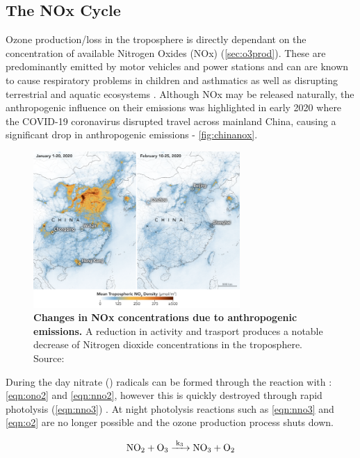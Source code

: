 \subsection{The NOx Cycle}\label{sec:noxcycle}
Ozone production/loss in the troposphere is directly dependant on the concentration of available Nitrogen Oxides (NOx) (\autoref{sec:o3prod}). These are predominantly emitted by motor vehicles and power stations and can are known to cause respiratory problems in children and asthmatics as well as disrupting terrestrial and aquatic ecosystems \citep{eea}. Although NOx may be released naturally, the anthropogenic influence on their emissions was highlighted in early 2020 where the COVID-19 coronavirus disrupted travel across mainland China, causing a significant drop in anthropogenic emissions - \autoref{fig:chinanox}.

\begin{figure}[H]
    \centering
    \includegraphics[width=0.7\textwidth]{china_trop_2020056.png}
    \caption{\textbf{Changes in NOx concentrations due to anthropogenic emissions.} A reduction in activity and trasport produces a notable decrease of Nitrogen dioxide concentrations in the troposphere. Source: \citep{chinanox}}
    \label{fig:chinanox}
\end{figure}

During the day nitrate () radicals can be formed through the reaction with : \autoref{eqn:ono2} and \autoref{eqn:nno2}, however this is quickly destroyed through rapid photolysis (\autoref{eqn:nno3}) \citep{nitrate}. At night photolysis reactions such as \autoref{eqn:nno3} and \autoref{eqn:o2} are no longer possible and the ozone production process shuts down.

\begin{equation}
  \ce{NO2 + O3 ->[k3] NO3 + O2}
  \label{eqn:nno2}
\end{equation}

